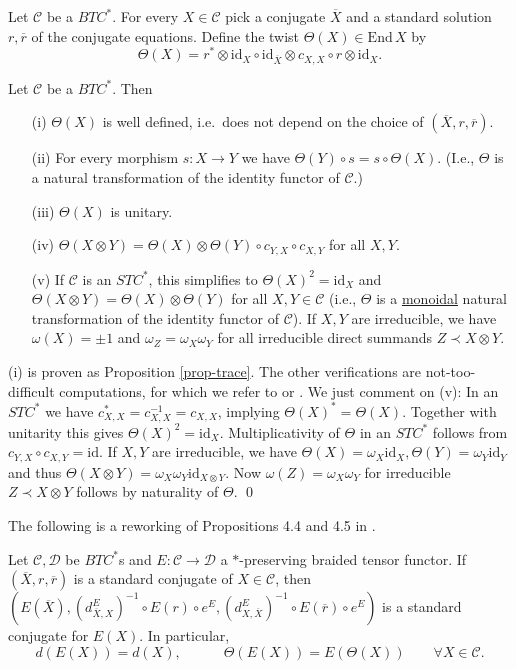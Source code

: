 \documentclass[11pt]{article}
\theoremstyle{definition}
\theoremstyle{definition}
\theoremstyle{remark}
\def\2#1{{\mathcal #1}}
\def\ol#1{{\overline #1}}
\newcommand{\End}{\mathrm{End}}
\newcommand{\mcirc}{\circ}
\newcommand{\rarr}{\rightarrow}
\def\id{\mathrm{id}}
\begin{document}
\bdefin \label{def-twist} 
Let $\2C$ be a $BTC^*$. For every $X\in\2C$ pick a conjugate $\ol{X}$ and a standard solution
$r, \ol{r}$ of the conjugate equations. Define the twist $\Theta(X)\in\End\,X$ by
\[ \Theta(X)=r^*\otimes\id_X\circ\id_{\ol{X}}\otimes c_{X,X}\circ r\otimes\id_X. \]
\edefin

\blemma \label{lem-twist}
Let $\2C$ be a $BTC^*$. Then
\begin{enumerate}
\item[(i)] $\Theta(X)$ is well defined, i.e.\ does not depend on the choice of $(\ol{X},r,\ol{r})$. 
\item[(ii)] For every morphism $s: X\rarr Y$ we have $\Theta(Y)\circ s=s\circ\Theta(X)$. (I.e.,
$\Theta$ is a natural transformation of the identity functor of $\2C$.) 
\item[(iii)] $\Theta(X)$ is unitary.
\item[(iv)] $\Theta(X\otimes Y)=\Theta(X)\otimes\Theta(Y)\mcirc c_{Y,X}\mcirc c_{X,Y}$ for all
$X,Y$. 
\item[(v)] If $\2C$ is an $STC^*$, this simplifies to $\Theta(X)^2=\id_X$ and
$\Theta(X\otimes Y)=\Theta(X)\otimes\Theta(Y)$ for all $X,Y\in\2C$ (i.e., $\Theta$ is a
\underline{monoidal} natural transformation of the identity functor of $\2C$). If $X,Y$ are
irreducible, we have $\omega(X)=\pm 1$ and $\omega_Z=\omega_X\omega_Y$ for all irreducible direct
summands $Z\prec X\otimes Y$. 
\end{enumerate}
\elemma

\prf (i) is proven as Proposition \ref{prop-trace}. The other verifications are not-too-difficult
computations, for which we refer to \cite{LR} or \cite{mue06}. We just comment on (v): In an $STC^*$
we have $c_{X,X}^*=c_{X,X}^{-1}=c_{X,X}$, implying $\Theta(X)^*=\Theta(X)$. Together with unitarity
this gives $\Theta(X)^2=\id_X$. Multiplicativity of $\Theta$ in an $STC^*$ follows from 
$c_{Y,X}\mcirc c_{X,Y}=\id$. If $X,Y$ are irreducible, we have
$\Theta(X)=\omega_X\id_X, \Theta(Y)=\omega_Y\id_Y$ and thus 
$\Theta(X\otimes Y)=\omega_X\omega_Y\id_{X\otimes Y}$. Now $\omega(Z)=\omega_X\omega_Y$ for
irreducible $Z\prec X\otimes Y$ follows by naturality of $\Theta$.
\qed

The following is a reworking of Propositions 4.4 and 4.5 in \cite{LR}.

\bprop \label{prop-stand2}
Let $\2C,\2D$ be  $BTC^*$s and $E:\2C\rarr\2D$ a $*$-preserving braided tensor functor. If
$(\ol{X},r,\ol{r})$ is a standard conjugate of $X\in\2C$, then 
$(E(\ol{X}),(d^E_{\ol{X},X})^{-1}\circ E(r)\circ e^E,(d^E_{X,\ol{X}})^{-1}\circ E(\ol{r})\circ e^E)$ is a
standard conjugate for $E(X)$. In particular, 
\[ d(E(X))=d(X), \quad\quad\quad \Theta(E(X))=E(\Theta(X)) \quad\quad\forall X\in\2C. \]
\eprop
\end{document}
